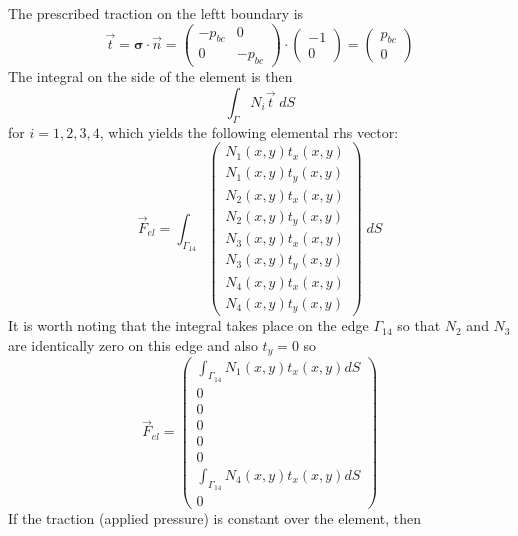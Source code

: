 The prescribed traction on the leftt boundary is
\[
{\vec t}={\bm \sigma}\cdot {\vec n}=
\left(
\begin{array}{cc}
-p_{bc} & 0 \\
0 & -p_{bc}
\end{array}
\right)
\cdot
\left(
\begin{array}{c}
-1 \\ 0
\end{array}
\right)
=
\left(
\begin{array}{c}
p_{bc} \\ 0
\end{array}
\right)
\]
The integral on the side of the element is then 
\[
\int_\Gamma N_i {\vec t} \; dS
\]
for $i=1,2,3,4$, which yields the following elemental rhs vector:
\[
\vec{F}_{el}=
\int_{\Gamma_{14}} 
\left(
\begin{array}{c}
N_1(x,y) t_x(x,y)\\
N_1(x,y) t_y(x,y)\\
N_2(x,y) t_x(x,y)\\
N_2(x,y) t_y(x,y)\\
N_3(x,y) t_x(x,y)\\
N_3(x,y) t_y(x,y)\\
N_4(x,y) t_x(x,y)\\
N_4(x,y) t_y(x,y)
\end{array}
\right)
\; dS
\]
It is worth noting that the integral takes place on the edge $\Gamma_{14}$ 
so that $N_2$ and $N_3$ are identically zero on this edge
and also $t_y=0$ 
so 
\[
\vec{F}_{el}=
\left(
\begin{array}{c}
\int_{\Gamma_{14}}  N_1(x,y) t_x(x,y) dS\\
0 \\
0 \\ 0 \\ 0 \\ 0 \\
\int_{\Gamma_{14}} N_4(x,y) t_x(x,y) dS\\
0
\end{array}
\right)
\]
If the traction (applied pressure) is constant over the element, 
then  
